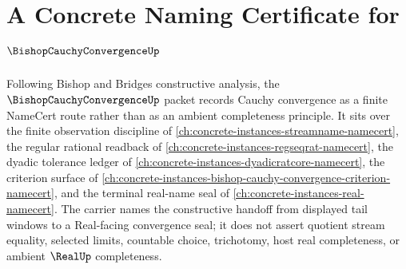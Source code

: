 \chapter{A Concrete Naming Certificate for $\BishopCauchyConvergenceUp$}
\label{ch:concrete-instances-bishop-cauchy-convergence-namecert}

Following Bishop and Bridges constructive analysis, the $\BishopCauchyConvergenceUp$ packet records Cauchy convergence as a finite NameCert route rather than as an ambient completeness principle. It sits over the finite observation discipline of \autoref{ch:concrete-instances-streamname-namecert}, the regular rational readback of \autoref{ch:concrete-instances-regseqrat-namecert}, the dyadic tolerance ledger of \autoref{ch:concrete-instances-dyadicratcore-namecert}, the criterion surface of \autoref{ch:concrete-instances-bishop-cauchy-convergence-criterion-namecert}, and the terminal real-name seal of \autoref{ch:concrete-instances-real-namecert}. The carrier names the constructive handoff from displayed tail windows to a Real-facing convergence seal; it does not assert quotient stream equality, selected limits, countable choice, trichotomy, host real completeness, or ambient $\RealUp$ completeness.

